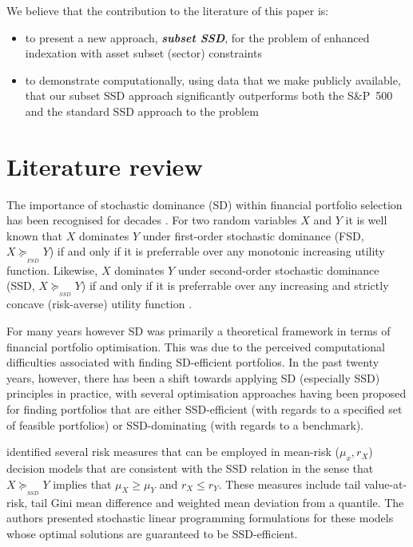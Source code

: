 \sloppy We believe that the contribution to the literature of this paper is:
\begin{itemize}
\item to present a new approach, \emph{\textbf{subset SSD}}, for the problem of enhanced indexation with asset subset (sector) constraints
\item to demonstrate computationally,
using data that we make publicly available,  
 that our subset SSD approach significantly outperforms both the  S\&P~500 and the standard SSD approach to the problem
\end{itemize}

\section{Literature review}
\label{sec2}

\sloppy The importance of stochastic dominance (SD) within financial portfolio selection has been recognised for decades \citep{hadar1969, bawa1975, levy1992}. For two 
random variables $X$ and $Y$ it is well known that $X$ dominates $Y$ under first-order stochastic
 dominance (FSD, $ X \succeq_{_{FSD}} Y$) if and only if it is preferrable over any monotonic increasing utility function. Likewise, $X$ dominates $Y$ under
 second-order stochastic dominance (SSD, $ X \succeq_{_{SSD}} Y$) if and only if it is preferrable over any increasing and strictly concave (risk-averse) utility function \citep{whitmore1978}.

For many years however SD was primarily a theoretical framework in terms of financial portfolio optimisation. This was
 due to the perceived computational difficulties associated with finding SD-efficient portfolios. In the past twenty years, however, there has been a shift towards applying SD (especially SSD) principles in practice, with several optimisation approaches having been proposed for finding portfolios that are either SSD-efficient (with regards to a
specified set of feasible portfolios) or SSD-dominating (with regards to a benchmark).

\cite{ogryczak2002} identified several risk measures that can be employed in mean-risk ($\mu_x, r_X$) decision models that are consistent with the SSD relation in the sense that $X \succeq_{_{SSD}} Y$ implies that $\mu_X \geq \mu_Y$ and $r_X \leq r_Y$. These measures include tail value-at-risk, tail Gini mean difference and weighted mean deviation from a quantile. The authors presented stochastic linear programming formulations for these models whose optimal solutions are guaranteed to be SSD-efficient.

